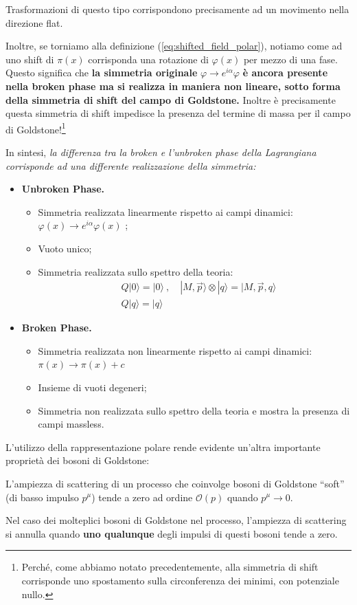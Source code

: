 \documentclass[../main.tex]{subfiles}
\begin{document}
\begin{enumerate}
    Trasformazioni di questo tipo corrispondono precisamente ad un movimento nella direzione flat.

    Inoltre, se torniamo alla definizione (\ref{eq:shifted_field_polar}), notiamo come ad uno shift di $\pi(x)$ corrisponda una rotazione di $\varphi(x)$ per mezzo di una fase. Questo significa che \textbf{la simmetria originale} $\varphi\rightarrow e^{i\alpha}\varphi$ \textbf{è ancora presente nella broken phase ma si realizza in maniera non lineare, sotto forma della simmetria di shift del campo di Goldstone.} Inoltre è precisamente questa simmetria di shift impedisce la presenza del termine di massa per il campo di Goldstone!\footnote{Perché, come abbiamo notato precedentemente, alla simmetria di shift corrisponde uno spostamento sulla circonferenza dei minimi, con potenziale nullo.}

    In sintesi, \textit{la differenza tra la broken e l'unbroken phase della Lagrangiana corrisponde ad una differente realizzazione della simmetria:}
    \begin{itemize}
        \item \textbf{Unbroken Phase.}
        \begin{itemize}
            \item Simmetria realizzata linearmente rispetto ai campi dinamici: $\varphi(x) \rightarrow e^{i\alpha}\varphi(x)$ ;
            \item Vuoto unico;
            \item Simmetria realizzata sullo spettro della teoria:
            \begin{align*}
                &Q|0\rangle = |0\rangle ~,\quad |M,\Vec{p}\rangle\otimes|q\rangle = |M,\Vec{p},q\rangle\\
                &Q|q\rangle = |q\rangle
            \end{align*}
        \end{itemize}
        \item \textbf{Broken Phase.}
        \begin{itemize}
            \item Simmetria realizzata non linearmente rispetto ai campi dinamici: $\pi(x) \rightarrow \pi(x) + c$
            \item Insieme di vuoti degeneri;
            \item Simmetria non realizzata sullo spettro della teoria e mostra la presenza di campi massless.
        \end{itemize}
    \end{itemize}
\end{enumerate}
L'utilizzo della rappresentazione polare rende evidente un'altra importante proprietà dei bosoni di Goldstone: 
\begin{theorem}
    L'ampiezza di scattering di un processo che coinvolge bosoni di Goldstone “soft” (di basso impulso $p^\mu$) tende a zero ad ordine $\mathscr O(p)$ quando $p^\mu\rightarrow 0$.
    \label{th:vanishing_goldstone_amplitudes}
\end{theorem}
Nel caso dei molteplici bosoni di Goldstone nel processo, l'ampiezza di scattering si annulla quando \textbf{uno qualunque} degli impulsi di questi bosoni tende a zero.
\end{document}
